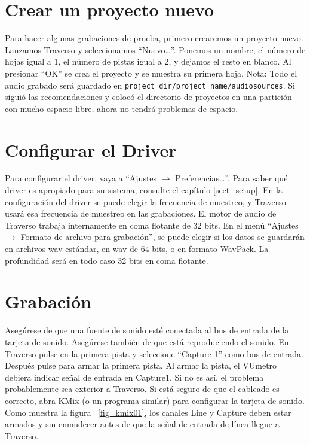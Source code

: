 ﻿\section{Crear un proyecto nuevo}
Para hacer algunas grabaciones de prueba, primero crearemos un proyecto nuevo. Lanzamos Traverso y seleccionamos ``Nuevo\dots''. Ponemos un nombre, el número de hojas igual a 1, el número de pistas igual a 2, y dejamos el resto en blanco. Al presionar ``OK'' se crea el proyecto y se muestra su primera hoja. Nota: Todo el audio grabado será guardado en \texttt{project\_dir/project\_name/audiosources}. Si siguió las recomendaciones y colocó el directorio de proyectos en una partición con mucho espacio libre, ahora no tendrá problemas de espacio.

\section{Configurar el Driver}
Para configurar el driver, vaya a ``Ajustes $\rightarrow$ Preferencias\dots''. Para saber qué driver es apropiado para su sistema, consulte el capítulo \ref{sect_setup}. En la configuración del driver se puede elegir la frecuencia de muestreo, y Traverso usará esa frecuencia de muestreo en las grabaciones. El motor de audio de Traverso trabaja internamente en coma flotante de 32 bits. En el menú ``Ajustes $\rightarrow$ Formato de archivo para grabación'', se puede elegir si los datos se guardarán en archivos wav estándar, en wav de 64 bits, o en formato WavPack. La profundidad será en todo caso 32 bits en coma flotante.

\section{Grabación}
Asegúrese de que una fuente de sonido esté conectada al bus de entrada de la tarjeta de sonido. Asegúrese también de que está reproduciendo el sonido. En Traverso pulse  en la primera pista y seleccione ``Capture 1'' como bus de entrada. Después pulse  para armar la primera pista. Al armar la pista, el VUmetro debiera indicar señal de entrada en Capture1. Si no es así, el problema probablemente sea exterior a Traverso. Si está seguro de que el cableado es correcto, abra KMix (o un programa similar) para configurar la tarjeta de sonido. Como muestra la figura \FigT\ \ref{fig_kmix01}, los canales Line y Capture deben estar armados y sin enmudecer antes de que la señal de entrada de línea llegue a Traverso.

